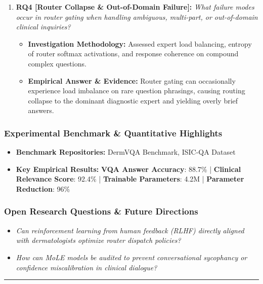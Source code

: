\begin{enumerate}[label=\textbf{\arabic*.}, leftmargin=*]
\begin{itemize}[leftmargin=1.5em]
    \item \textbf{Empirical Answer \& Evidence:} Achieved 88.7\% overall answer accuracy and 92.4\% clinical relevance, outperforming standard single-LoRA adaptation and fully fine-tuned smaller VLMs.
  \end{itemize}
  \item \textbf{RQ4 [Router Collapse \& Out-of-Domain Failure]:} \textit{What failure modes occur in router gating when handling ambiguous, multi-part, or out-of-domain clinical inquiries?}
  \begin{itemize}[leftmargin=1.5em]
    \item \textbf{Investigation Methodology:} Assessed expert load balancing, entropy of router softmax activations, and response coherence on compound complex questions.
    \item \textbf{Empirical Answer \& Evidence:} Router gating can occasionally experience load imbalance on rare question phrasings, causing routing collapse to the dominant diagnostic expert and yielding overly brief answers.
  \end{itemize}
\end{enumerate}

\subsubsection*{Experimental Benchmark \& Quantitative Highlights}
\begin{itemize}[leftmargin=*]
  \item \textbf{Benchmark Repositories:} DermVQA Benchmark, ISIC-QA Dataset
  \item \textbf{Key Empirical Results:} \textbf{VQA Answer Accuracy}: 88.7\% \quad | \quad \textbf{Clinical Relevance Score}: 92.4\% \quad | \quad \textbf{Trainable Parameters}: 4.2M \quad | \quad \textbf{Parameter Reduction}: 96\%
\end{itemize}

\subsubsection*{Open Research Questions \& Future Directions}
\begin{itemize}[leftmargin=*]
  \item \textit{Can reinforcement learning from human feedback (RLHF) directly aligned with dermatologists optimize router dispatch policies?}
  \item \textit{How can MoLE models be audited to prevent conversational sycophancy or confidence miscalibration in clinical dialogue?}
\end{itemize}
\vspace{0.8em}\hrule\vspace{1.2em}
